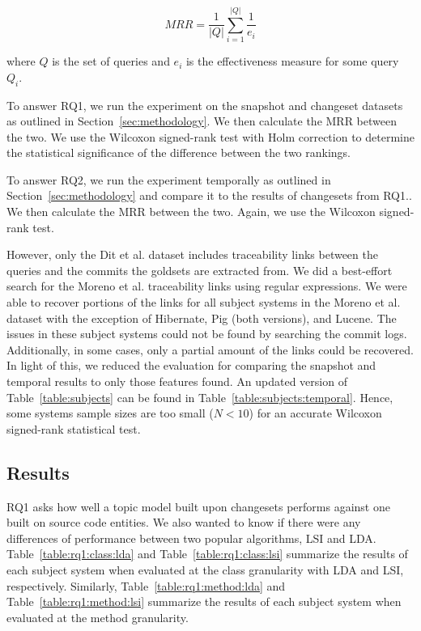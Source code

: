 \begin{equation}
    MRR = \frac{1}{|Q|} \sum_{i=1}^{|Q|} \frac{1}{e_i}
\end{equation}

where $Q$ is the set of queries
and $e_i$ is the effectiveness measure for some query $Q_i$.

To answer RQ1, we run the experiment on the snapshot and changeset
datasets as outlined in Section~\ref{sec:methodology}.
We then calculate the MRR between the two.
We use the Wilcoxon signed-rank test with Holm correction to determine
the statistical significance of the difference between the two rankings.

To answer RQ2, we run the experiment temporally as outlined in Section~\ref{sec:methodology}
and compare it to the results of changesets from RQ1..
We then calculate the MRR between the two.  Again, we use the Wilcoxon signed-rank test.

However, only the Dit et al. dataset includes traceability links between
the queries and the commits the goldsets are extracted from.
We did a best-effort search for the Moreno et al. traceability links using regular expressions.
We were able to recover portions of the links for all subject systems in
the Moreno et al. dataset with the exception of Hibernate, Pig (both versions), and Lucene.
The issues in these subject systems could not be found by searching the commit logs.
Additionally, in some cases, only a partial amount of the links could be
recovered. In light of this, we reduced the evaluation for comparing the
snapshot and temporal results to only those features found.
An updated version of Table~\ref{table:subjects} can be found in Table~\ref{table:subjects:temporal}.
Hence, some systems sample sizes are too small ($N<10$) for an accurate Wilcoxon signed-rank statistical test.




\subsection{Results}







RQ1 asks how well a topic model built upon changesets performs against
one built on source code entities.
We also wanted to know if there were any differences of performance
between two popular algorithms, LSI and LDA.
Table~\ref{table:rq1:class:lda} and Table~\ref{table:rq1:class:lsi}
summarize the results of each subject system when
evaluated at the class granularity with LDA and LSI, respectively.
Similarly, Table~\ref{table:rq1:method:lda} and Table~\ref{table:rq1:method:lsi}
summarize the results of each subject system when
evaluated at the method granularity.

